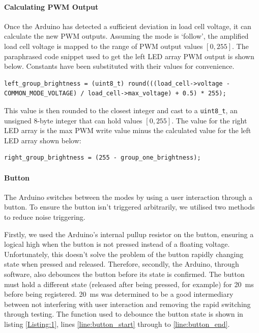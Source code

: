 \documentclass[twoside]{article}
\begin{document}
            \paragraph{Calculating PWM Output}
            Once the Arduino has detected a sufficient deviation in load cell voltage, it can calculate the new PWM outputs. Assuming the mode is `follow', the amplified load cell voltage is mapped to the range of PWM output values \(\left[0, 255\right]\). The paraphrased code snippet used to get the left LED array PWM output is shown below. Constants have been substituted with their values for convenience. 
            \begin{lstlisting}
left_group_brightness = (uint8_t) round(((load_cell->voltage - COMMON_MODE_VOLTAGE) / load_cell->max_voltage) + 0.5) * 255);
            \end{lstlisting}
            This value is then rounded to the closest integer and cast to a \texttt{uint8\_t}, an unsigned 8-byte integer that can hold values \(\left[0, 255\right]\). The value for the right LED array is the max PWM write value minus the calculated value for the left LED array shown below:
            \begin{lstlisting}
right_group_brightness = (255 - group_one_brightness); 
            \end{lstlisting}
            \paragraph{Button}
            The Arduino switches between the modes by using a user interaction through a button. To ensure the button isn't triggered arbitrarily, we utilised two methods to reduce noise triggering. 

            Firstly, we used the Arduino's internal pullup resistor on the button, ensuring a logical high when the button is not pressed instead of a floating voltage. Unfortunately, this doesn't solve the problem of the button rapidly changing state when pressed and released. Therefore, secondly, the Arduino, through software, also debounces the button before its state is confirmed. The button must hold a different state (released after being pressed, for example) for \SI{20}{\milli\second} before being registered. \SI{20}{\milli\second} was determined to be a good intermediary between not interfering with user interaction and removing the rapid switching through testing. The function used to debounce the button state is shown in listing \ref{Listing:1}, lines \ref{line:button_start} through to \ref{line:button_end}.
\end{document}
